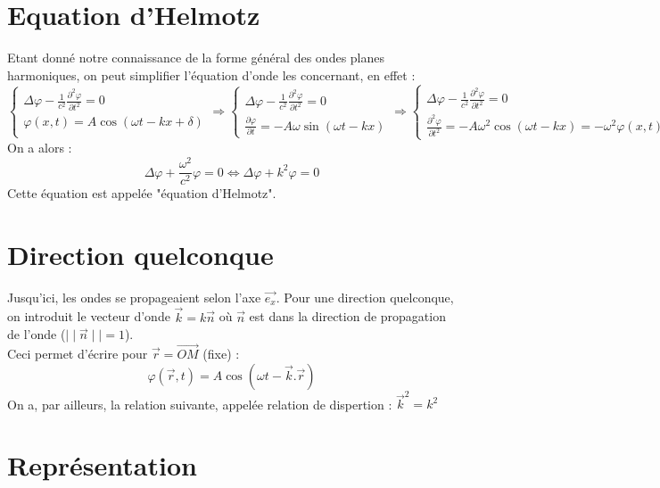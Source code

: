 \section{Equation d'Helmotz}
Etant donné notre connaissance de la forme général des ondes planes harmoniques, on peut simplifier l'équation d'onde les concernant, en effet :
\[
\left \{
  \begin{array}{ll}
  \Delta\varphi-\frac{1}{c^2}\frac{\partial^2\varphi}{\partial t^2}=0 \\
  \varphi(x,t)=A\cos(\omega t -kx+\delta) \\
  \end{array}
\right.
\Rightarrow
\left \{
  \begin{array}{ll}
  \Delta\varphi-\frac{1}{c^2}\frac{\partial^2\varphi}{\partial t^2}=0 \\
  \frac{\partial\varphi}{\partial t}=-A\omega\sin(\omega t -kx)
  \end{array}
\right.
\Rightarrow
\left \{
  \begin{array}{ll}
  \Delta\varphi-\frac{1}{c^2}\frac{\partial^2\varphi}{\partial t^2}=0 \\
  \frac{\partial^2\varphi}{\partial t^2}=-A\omega^2\cos(\omega t -kx)=-\omega^2\varphi(x,t)
  \end{array}
\right.
\]
On a alors : 
\[ \Delta\varphi+\frac{\omega^2}{c^2}\varphi = 0 \Leftrightarrow \Delta\varphi+k^2\varphi = 0 \]
Cette équation est appelée "équation d'Helmotz".

\section{Direction quelconque}
Jusqu'ici, les ondes se propageaient selon l'axe $\vec{e_x}$. Pour une direction quelconque, on introduit le vecteur d'onde $\vec{k}=k\vec{n}$ où $\vec{n}$ est dans la direction de propagation de l'onde ($\mid\mid\vec{n}\mid\mid=1$).\\
Ceci permet d'écrire pour $\vec{r}=\vec{OM}$ (fixe) : 
\[\varphi(\vec{r},t)=A\cos(\omega t -\vec{k}.\vec{r})\]
On a, par ailleurs, la relation suivante, appelée relation de dispertion : $\vec{k}^2=k^2$

\section{Représentation}

